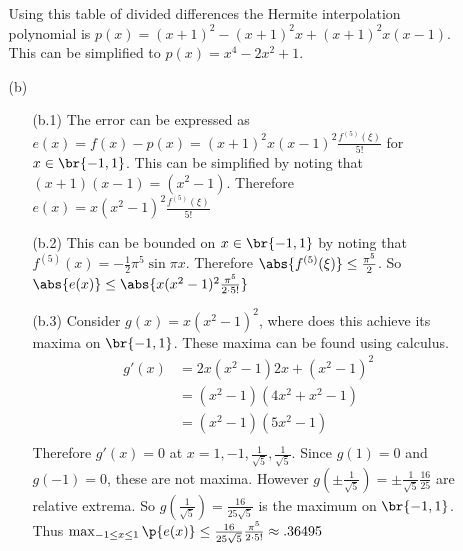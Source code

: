 \documentclass[11pt]{article}
\begin{document}
\begin{enumerate}
\begin{enumerate}
                Using this table of divided differences the Hermite
                interpolation polynomial is $p(x) = (x + 1)^2 - (x + 1)^2 x +
                (x + 1)^2 x (x - 1)$.
                This can be simplified to $p(x) = x^4 - 2x^2 + 1$.

            \item[(b)]
                \begin{enumerate}
                    \item[(b.1)]
                        The error can be expressed as $e(x) = f(x) - p(x) =
                        (x + 1)^2 x (x-1)^2 \frac{f^{(5)}(\xi)}{5!}$ for $x
                        \in \br{-1, 1}$.
                        This can be simplified by noting that $(x + 1)(x - 1) = (x^2 - 1)$.
                        Therefore $e(x) = x(x^2-1)^2 \frac{f^{(5)}(\xi)}{5!}$

                    \item[(b.2)]
                        This can be bounded on $x \in \br{-1, 1}$ by noting that
                        $f^{(5)}(x) = -\frac{1}{2} \pi^5 \sin{\pi x}$.
                        Therefore $\abs{f^{(5)}(\xi)} \le \frac{\pi^5}{2}$.
                        So $\abs{e(x)} \le \abs{x(x^2-1)^2 \frac{\pi^5}{2\cdot5!}}$

                    \item[(b.3)]
                        Consider $g(x) = x(x^2 - 1)^2$, where does this
                        achieve its maxima on $\br{-1, 1}$.
                        These maxima can be found using calculus.
                        \begin{align*}
                            g'(x) &= 2x(x^2 - 1)2x + (x^2 - 1)^2 \\
                                  &= (x^2 - 1)(4x^2 + x^2 - 1) \\
                                  &= (x^2 - 1)(5x^2 - 1) \\
                        \end{align*}
                        Therefore $g'(x) = 0$ at $x = 1, -1, 
                        \frac{1}{\sqrt{5}}, \frac{1}{\sqrt{5}}$.
                        Since $g(1) = 0$ and $g(-1) = 0$, these are not maxima.
                        However $g(\pm \frac{1}{\sqrt{5}}) = \pm\frac{1}{\sqrt{5}} \frac{16}{25}$
                        are relative extrema.
                        So $g(\frac{1}{\sqrt{5}}) = \frac{16}{25\sqrt{5}}$ is
                        the maximum on $\br{-1,1}$.
                        Thus $\max_{-1 \le x \le 1}\p{e(x)} \le
                        \frac{16}{25\sqrt{5}} \frac{\pi^5}{2\cdot5!} \approx .36495$
                \end{enumerate}
        \end{enumerate}


\end{enumerate}
\end{document}
